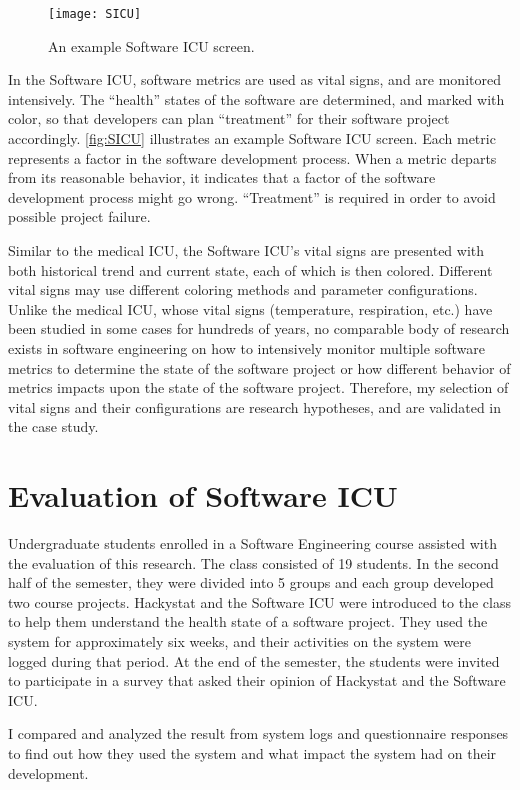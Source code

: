 \begin{figure}[htbp]
   \centering
   \texttt{[image: SICU]}
   \caption{An example Software ICU screen.}
   \label{fig:SICU}
\end{figure}


In the Software ICU, software metrics are used as vital signs, and are monitored intensively. The ``health'' states of the software are determined, and marked with color, so that developers can plan ``treatment'' for their software project accordingly. \autoref{fig:SICU} illustrates an example Software ICU screen. Each metric represents a factor in the software development process. When a metric departs from its reasonable behavior, it indicates that a factor of the software development process might go wrong. ``Treatment'' is required  in order to avoid possible project failure.
 
Similar to the medical ICU, the Software ICU's vital signs are presented with both historical trend and current state, each of which is then colored. Different vital signs may use different coloring methods and parameter configurations. Unlike the medical ICU, whose vital signs (temperature, respiration, etc.) have been studied in some cases for hundreds of years, no comparable body of research exists in software engineering on how to intensively monitor multiple software metrics to determine the state of the software project or how different behavior of metrics impacts upon the state of the software project. Therefore, my selection of vital signs and their configurations are research hypotheses, and are validated in the case study.

\section{Evaluation of Software ICU}
Undergraduate students enrolled in a Software Engineering course assisted with the evaluation of this research. The class consisted of 19 students. In the second half of the semester, they were divided into 5 groups and each group developed two course projects. Hackystat and the Software ICU were introduced to the class to help them understand the health state of a software project. They used the system for approximately six weeks, and their activities on the system were logged during that period. At the end of the semester, the students were invited to participate in a survey that asked their opinion of Hackystat and the Software ICU.

I compared and analyzed the result from system logs and questionnaire responses to find out how they used the system and what impact the system had on their development.

